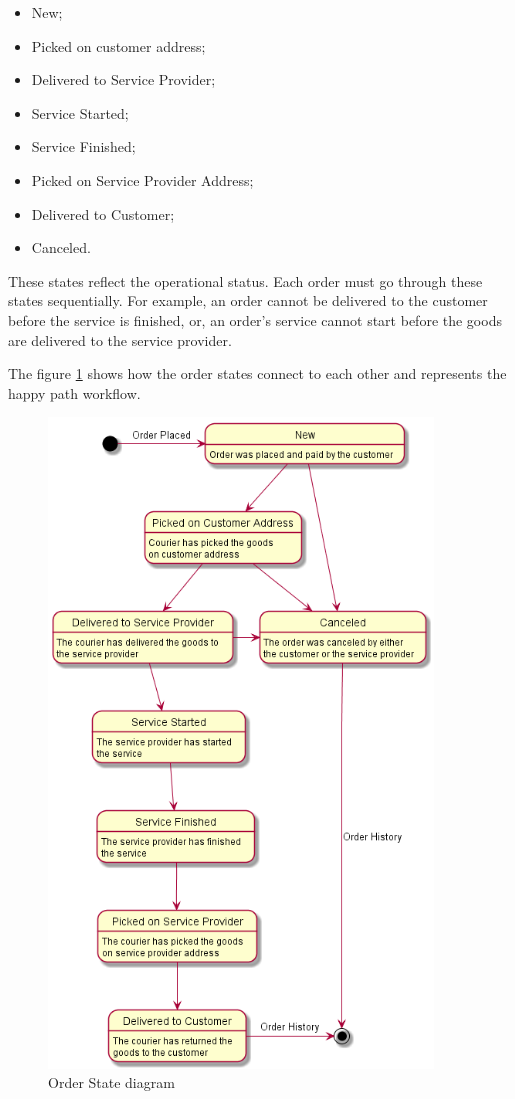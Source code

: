 \begin{itemize}
    \item New;
    \item Picked on customer address;
    \item Delivered to Service Provider;
    \item Service Started;
    \item Service Finished;
    \item Picked on Service Provider Address;
    \item Delivered to Customer;
    \item Canceled.
\end{itemize}

These states reflect the operational status. Each order must go through these states sequentially. For example, an order cannot be delivered to the customer before the service is finished, or, an order's service cannot start before the goods are delivered to the service provider.
\par
The figure \ref{fig:orderStateDiagram} shows how the order states connect to each other and represents the happy path workflow.

\begin{figure}[ht]
\centering
\includegraphics[width=0.91\textwidth,keepaspectratio]{chapters/Requirements_Engineering/assets/StateDiagram.png}
\caption[Order State diagram]{Order State diagram}
\label{fig:orderStateDiagram}
\end{figure}
